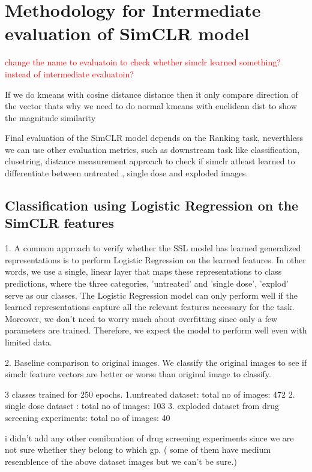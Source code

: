 \chapter{Methodology for Intermediate evaluation of SimCLR model}\label{ch:Methodology for Intermediate evaluation of SimCLR model}

\textcolor{red}{change the name to evaluatoin to check whether simclr learned something? instead of intermediate evaluatoin?}  

If we do kmeans with cosine distance distance then it only compare direction of the vector thats why we need to do normal kmeans with euclidean dist to show 
the magnitude similarity

Final evaluation of the SimCLR model depends on the  Ranking task, neverthless we can use other evaluation metrics, such as downstream task 
like classification, clusetring, distance measurement approach to check if simclr atleast learned to differentiate between untreated , single dose and exploded images.

\section{Classification using Logistic Regression on the SimCLR features}
1. A common approach to verify whether the SSL model has learned generalized representations is to perform Logistic Regression on the learned features.
 In other words, we use a single, linear layer that maps these representations to class predictions, where the three categories, 'untreated' and 'single dose', 'explod'  
 serve as our classes. The Logistic Regression model can only perform well if the learned representations capture all the relevant features necessary for the task. 
 Moreover, we don't need to worry much about overfitting since only a few parameters are trained. Therefore, we expect the model to perform well even with limited data.
 

2. Baseline comparison to original images. We classify the original images to see if simclr feature vectors are better or worse than original image to classify.


3 classes trained for 250 epochs.
1.untreated dataset: total no of images: 472
2. single dose dataset :  total no of images: 103
3. exploded dataset from drug screening experiments:  total no of images:  40

i didn't add any other comibnation of drug screening experiments since we are not sure whether they belong to which gp. ( some of them have medium resemblence of the
 above dataset images but we can't be sure.)


